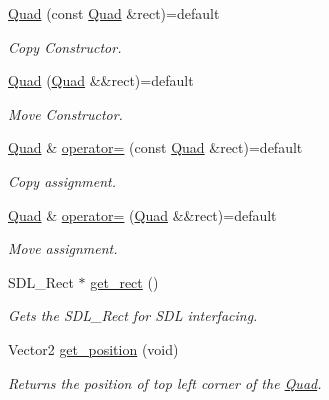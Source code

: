 \begin{DoxyCompactItemize}
\mbox{\hyperlink{classinferno_1_1graphics_1_1_quad_a9d9cc7ada7648b434b7401d88435530f}{Quad}} (const \mbox{\hyperlink{classinferno_1_1graphics_1_1_quad}{Quad}} \&rect)=default
\begin{DoxyCompactList}\small\item\em Copy Constructor. \end{DoxyCompactList}\item 
\mbox{\hyperlink{classinferno_1_1graphics_1_1_quad_a6c4c6693883f26437908876e72aba247}{Quad}} (\mbox{\hyperlink{classinferno_1_1graphics_1_1_quad}{Quad}} \&\&rect)=default
\begin{DoxyCompactList}\small\item\em Move Constructor. \end{DoxyCompactList}\item 
\mbox{\hyperlink{classinferno_1_1graphics_1_1_quad}{Quad}} \& \mbox{\hyperlink{classinferno_1_1graphics_1_1_quad_ab2956c4435741605c0943d5e6087e690}{operator=}} (const \mbox{\hyperlink{classinferno_1_1graphics_1_1_quad}{Quad}} \&rect)=default
\begin{DoxyCompactList}\small\item\em Copy assignment. \end{DoxyCompactList}\item 
\mbox{\hyperlink{classinferno_1_1graphics_1_1_quad}{Quad}} \& \mbox{\hyperlink{classinferno_1_1graphics_1_1_quad_a2061f2390481b6c66187c8c7377e085d}{operator=}} (\mbox{\hyperlink{classinferno_1_1graphics_1_1_quad}{Quad}} \&\&rect)=default
\begin{DoxyCompactList}\small\item\em Move assignment. \end{DoxyCompactList}\item 
S\+D\+L\+\_\+\+Rect $\ast$ \mbox{\hyperlink{classinferno_1_1graphics_1_1_quad_a104d87586cb42af3eac4a4e0bd8b2b60}{get\+\_\+rect}} ()
\begin{DoxyCompactList}\small\item\em Gets the S\+D\+L\+\_\+\+Rect for S\+DL interfacing. \end{DoxyCompactList}\item 
Vector2 \mbox{\hyperlink{classinferno_1_1graphics_1_1_quad_a831d0c73cd040595dc44188d1941bcc6}{get\+\_\+position}} (void)
\begin{DoxyCompactList}\small\item\em Returns the position of top left corner of the \mbox{\hyperlink{classinferno_1_1graphics_1_1_quad}{Quad}}. \end{DoxyCompactList}\item 

\end{DoxyCompactItemize}
